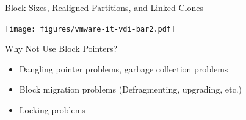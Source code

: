\documentclass[usepdftitle=false,hyperref={pdfpagelabels=false},t]{beamer}
\begin{document}

\begin{frame}[plain]
\end{frame}

\begin{frame}[c]{Block Sizes, Realigned Partitions, and Linked Clones}
  \begin{center}
    \texttt{[image: figures/vmware-it-vdi-bar2.pdf]}
  \end{center}
\end{frame}

\begin{frame}{Why Not Use Block Pointers?}
  \begin{itemize}
  \item Dangling pointer problems, garbage collection problems
  \item Block migration problems (Defragmenting, upgrading, etc.)
  \item Locking problems
  \end{itemize}
\end{frame}
\end{document}
